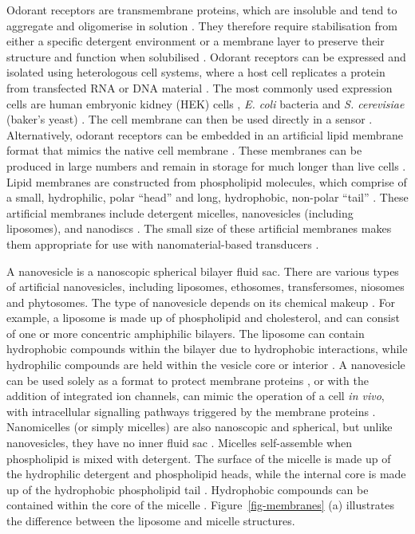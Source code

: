 \documentclass[
  a4paper,
]{scrbook}
\begin{document}
Odorant receptors are transmembrane proteins, which are insoluble and
tend to aggregate and oligomerise in solution \autocite{Nath2007}. They
therefore require stabilisation from either a specific detergent
environment or a membrane layer to preserve their structure and function
when solubilised \autocite{Fruh2011,Dung2018}. Odorant receptors can be
expressed and isolated using heterologous cell systems, where a host
cell replicates a protein from transfected RNA or DNA material
\autocite{Glatz2011,Dung2018}. The most commonly used expression cells
are human embryonic kidney (HEK) cells \autocite{Lim2014,Ahn2020},
\emph{E. coli} bacteria \autocite{Yang2017,Yang2018} and \emph{S.
cerevisiae} (baker's yeast) \autocite{Bohbot2020}. The cell membrane can
then be used directly in a sensor \autocite{Dung2018}. Alternatively,
odorant receptors can be embedded in an artificial lipid membrane format
that mimics the native cell membrane \autocite{Nath2007}. These
membranes can be produced in large numbers and remain in storage for
much longer than live cells \autocite{Goldsmith2011,Lim2015}. Lipid
membranes are constructed from phospholipid molecules, which comprise of
a small, hydrophilic, polar ``head'' and long, hydrophobic, non-polar
``tail'' \autocite{Bose2021,Ramadon2022}. These artificial membranes
include detergent micelles, nanovesicles (including liposomes), and
nanodiscs \autocite{Yang2018,Moon2020}. The small size of these
artificial membranes makes them appropriate for use with
nanomaterial-based transducers \autocite{Lim2015,Dung2018}.

A nanovesicle is a nanoscopic spherical bilayer fluid sac. There are
various types of artificial nanovesicles, including liposomes,
ethosomes, transfersomes, niosomes and phytosomes. The type of
nanovesicle depends on its chemical makeup \autocite{Ramadon2022}. For
example, a liposome is made up of phospholipid and cholesterol, and can
consist of one or more concentric amphiphilic bilayers. The liposome can
contain hydrophobic compounds within the bilayer due to hydrophobic
interactions, while hydrophilic compounds are held within the vesicle
core or interior \autocite{Nath2007,Ramadon2022}. A nanovesicle can be
used solely as a format to protect membrane proteins
\autocite{Murugathas2020}, or with the addition of integrated ion
channels, can mimic the operation of a cell \emph{in vivo}, with
intracellular signalling pathways triggered by the membrane proteins
\autocite{Lim2015}. Nanomicelles (or simply micelles) are also
nanoscopic and spherical, but unlike nanovesicles, they have no inner
fluid sac \autocite{Nath2007,Bose2021}. Micelles self-assemble when
phospholipid is mixed with detergent. The surface of the micelle is made
up of the hydrophilic detergent and phospholipid heads, while the
internal core is made up of the hydrophobic phospholipid tail
\autocite{Nath2007}. Hydrophobic compounds can be contained within the
core of the micelle \autocite{Bose2021}. Figure~\ref{fig-membranes} (a)
illustrates the difference between the liposome and micelle structures.
\end{document}

